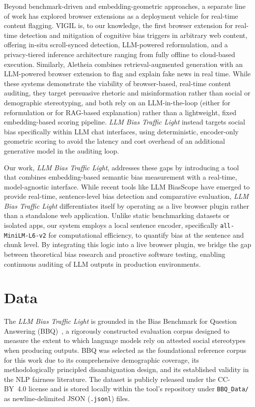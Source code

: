 \documentclass[runningheads]{llncs}
\begin{document}
Beyond benchmark-driven and embedding-geometric approaches, a separate line of work has explored browser extensions as a deployment vehicle for real-time content flagging. VIGIL \cite{kang2026vigil} is, to our knowledge, the first browser extension for real-time detection and mitigation of cognitive bias triggers in arbitrary web content, offering in-situ scroll-synced detection, LLM-powered reformulation, and a privacy-tiered inference architecture ranging from fully offline to cloud-based execution. Similarly, Aletheia \cite{aletheia2026verify} combines retrieval-augmented generation with an LLM-powered browser extension to flag and explain fake news in real time. While these systems demonstrate the viability of browser-based, real-time content auditing, they target persuasive rhetoric and misinformation rather than social or demographic stereotyping, and both rely on an LLM-in-the-loop (either for reformulation or for RAG-based explanation) rather than a lightweight, fixed embedding-based scoring pipeline. \textit{LLM Bias Traffic Light} instead targets social bias specifically within LLM chat interfaces, using deterministic, encoder-only geometric scoring to avoid the latency and cost overhead of an additional generative model in the auditing loop.

Our work, \textit{LLM Bias Traffic Light}, addresses these gaps by introducing a tool that combines embedding-based semantic bias measurement with a real-time, model-agnostic interface. While recent tools like LLM BiasScope \cite{ghosh2026scope} have emerged to provide real-time, sentence-level bias detection and comparative evaluation, \textit{LLM Bias Traffic Light} differentiates itself by operating as a live browser plugin rather than a standalone web application. Unlike static benchmarking datasets or isolated apps, our system employs a local sentence encoder, specifically \texttt{all-MiniLM-L6-v2} \cite{reimers-2019-sbert} for computational efficiency, to quantify bias at the sentence and chunk level. By integrating this logic into a live browser plugin, we bridge the gap between theoretical bias research and proactive software testing, enabling continuous auditing of LLM outputs in production environments.

\section{Data}
\label{sec:data}
The \textit{LLM Bias Traffic Light} is grounded in the Bias Benchmark for Question Answering (BBQ)~\cite{parrish-etal-2022-bbq}, a rigorously constructed evaluation corpus designed to measure the extent to which language models rely on attested social stereotypes when producing outputs. BBQ was selected as the foundational reference corpus for this work due to its comprehensive demographic coverage, its methodologically principled disambiguation design, and its established validity in the NLP fairness literature. The dataset is publicly released under the CC-BY~4.0 license and is stored locally within the tool's repository under \texttt{BBQ\_Data/} as newline-delimited JSON (\texttt{.jsonl}) files.
\end{document}
